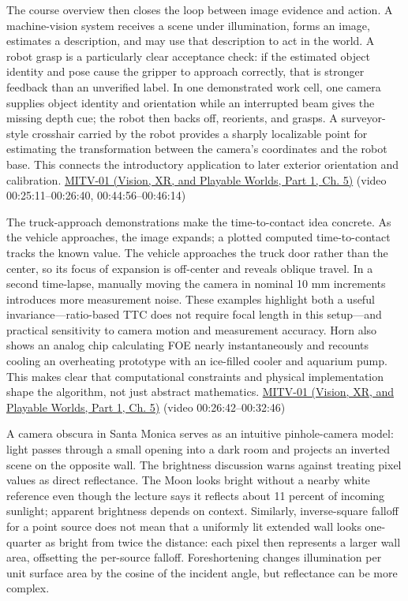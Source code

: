 The course overview then closes the loop between image evidence and action. A machine-vision system receives a scene under illumination, forms an image, estimates a description, and may use that description to act in the world. A robot grasp is a particularly clear acceptance check: if the estimated object identity and pose cause the gripper to approach correctly, that is stronger feedback than an unverified label. In one demonstrated work cell, one camera supplies object identity and orientation while an interrupted beam gives the missing depth cue; the robot then backs off, reorients, and grasps. A surveyor-style crosshair carried by the robot provides a sharply localizable point for estimating the transformation between the camera's coordinates and the robot base. This connects the introductory application to later exterior orientation and calibration. \href{../07-Vision-XR-and-Playable-Worlds-P01/main.pdf\#nameddest=04-visual-computing-ii-ch036-mitv-01---introduction-to-machine-vision}{MITV-01 (Vision, XR, and Playable Worlds, Part 1, Ch. 5)} (video 00:25:11--00:26:40, 00:44:56--00:46:14)

The truck-approach demonstrations make the time-to-contact idea concrete. As the vehicle approaches, the image expands; a plotted computed time-to-contact tracks the known value. The vehicle approaches the truck door rather than the center, so its focus of expansion is off-center and reveals oblique travel. In a second time-lapse, manually moving the camera in nominal 10 mm increments introduces more measurement noise. These examples highlight both a useful invariance---ratio-based TTC does not require focal length in this setup---and practical sensitivity to camera motion and measurement accuracy. Horn also shows an analog chip calculating FOE nearly instantaneously and recounts cooling an overheating prototype with an ice-filled cooler and aquarium pump. This makes clear that computational constraints and physical implementation shape the algorithm, not just abstract mathematics. \href{../07-Vision-XR-and-Playable-Worlds-P01/main.pdf\#nameddest=04-visual-computing-ii-ch036-mitv-01---introduction-to-machine-vision}{MITV-01 (Vision, XR, and Playable Worlds, Part 1, Ch. 5)} (video 00:26:42--00:32:46)

A camera obscura in Santa Monica serves as an intuitive pinhole-camera model: light passes through a small opening into a dark room and projects an inverted scene on the opposite wall. The brightness discussion warns against treating pixel values as direct reflectance. The Moon looks bright without a nearby white reference even though the lecture says it reflects about 11 percent of incoming sunlight; apparent brightness depends on context. Similarly, inverse-square falloff for a point source does not mean that a uniformly lit extended wall looks one-quarter as bright from twice the distance: each pixel then represents a larger wall area, offsetting the per-source falloff. Foreshortening changes illumination per unit surface area by the cosine of the incident angle, but reflectance can be more complex.

